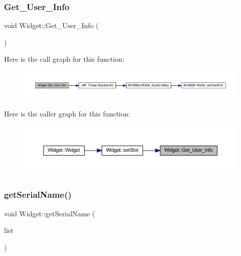 \subsubsection{\texorpdfstring{Get\_User\_Info}{Get\_User\_Info}}
{\footnotesize\ttfamily void Widget\+::\+Get\+\_\+\+User\+\_\+\+Info (\begin{DoxyParamCaption}{ }\end{DoxyParamCaption})\hspace{0.3cm}{\ttfamily [slot]}}

Here is the call graph for this function\+:
\nopagebreak
\begin{figure}[H]
\begin{center}
\leavevmode
\includegraphics[width=350pt]{class_widget_a349b456bf6a673058ef7449e44866e90_cgraph}
\end{center}
\end{figure}
Here is the caller graph for this function\+:
\nopagebreak
\begin{figure}[H]
\begin{center}
\leavevmode
\includegraphics[width=350pt]{class_widget_a349b456bf6a673058ef7449e44866e90_icgraph}
\end{center}
\end{figure}
\mbox{\label{class_widget_afb97de9294ffdbb2c64ed1f96aea9261}} 
\subsubsection{\texorpdfstring{getSerialName()}{getSerialName()}}
{\footnotesize\ttfamily void Widget\+::get\+Serial\+Name (\begin{DoxyParamCaption}\item[{Q\+String\+List $\ast$}]{list }\end{DoxyParamCaption})}

